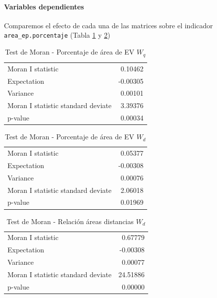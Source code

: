 \documentclass[12pt,]{book}
\let\oldparagraph\paragraph
\renewcommand{\paragraph}[1]{\oldparagraph{#1}\mbox{}}
\begin{document}
\paragraph{Variables dependientes}\label{variables-dependientes}

Comparemos el efecto de cada una de las matrices sobre el indicador
\texttt{area\_ep.porcentaje} (Tabla \ref{tab:moran-areaep-wq} y
\ref{tab:moran-areaep-wd})

\begin{table}

\caption{\label{tab:moran-areaep-wq}Test de Moran - Porcentaje de área de EV $W_q$}
\centering
\begin{tabular}[t]{lr}
\toprule
  &  \\
\midrule
Moran I statistic & 0.10462\\
Expectation & -0.00305\\
Variance & 0.00101\\
Moran I statistic standard deviate & 3.39376\\
p-value & 0.00034\\
\bottomrule
\end{tabular}
\end{table}

\begin{table}

\caption{\label{tab:moran-areaep-wd}Test de Moran - Porcentaje de área de EV $W_d$}
\centering
\begin{tabular}[t]{lr}
\toprule
  &  \\
\midrule
Moran I statistic & 0.05377\\
Expectation & -0.00308\\
Variance & 0.00076\\
Moran I statistic standard deviate & 2.06018\\
p-value & 0.01969\\
\bottomrule
\end{tabular}
\end{table}

\begin{table}

\caption{\label{tab:moran-areadist-wd}Test de Moran - Relación áreas distancias $W_d$}
\centering
\begin{tabular}[t]{lr}
\toprule
  &  \\
\midrule
Moran I statistic & 0.67779\\
Expectation & -0.00308\\
Variance & 0.00077\\
Moran I statistic standard deviate & 24.51886\\
p-value & 0.00000\\
\bottomrule
\end{tabular}
\end{table}
\end{document}

